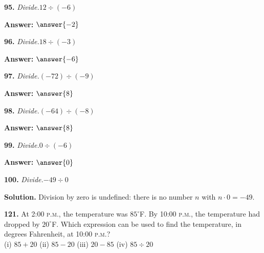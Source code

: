 \documentclass{ximera}
\begin{document}
\begin{problem}
\textbf{95.} \emph{Divide.}\quad $12 \div (-6)$

\textbf{Answer:} $\answer{-2}$
\end{problem}

\begin{problem}
\textbf{96.} \emph{Divide.}\quad $18 \div (-3)$

\textbf{Answer:} $\answer{-6}$
\end{problem}

\begin{problem}
\textbf{97.} \emph{Divide.}\quad $(-72) \div (-9)$

\textbf{Answer:} $\answer{8}$
\end{problem}

\begin{problem}
\textbf{98.} \emph{Divide.}\quad $(-64) \div (-8)$

\textbf{Answer:} $\answer{8}$
\end{problem}

\begin{problem}
\textbf{99.} \emph{Divide.}\quad $0 \div (-6)$

\textbf{Answer:} $\answer{0}$
\end{problem}

\begin{problem}
\textbf{100.} \emph{Divide.}\quad $-49 \div 0$

\begin{multipleChoice}
\end{multipleChoice}

\begin{hint}
\textbf{Solution.} Division by zero is undefined: there is no number $n$ with $n\cdot 0=-49$.
\end{hint}
\end{problem}

\begin{problem}
\textbf{121.} At 2:00 \textsc{p.m.}, the temperature was $85^\circ$F. By 10:00 \textsc{p.m.},
  the temperature had dropped by $20^\circ$F. Which expression can be used to find the
  temperature, in degrees Fahrenheit, at 10:00 \textsc{p.m.}?
  \\[2pt]
  (i) $85 + 20$ \qquad (ii) $85 - 20$ \qquad (iii) $20 - 85$ \qquad (iv) $85 \div 20$

\begin{multipleChoice}
\end{multipleChoice}
\end{problem}
\end{document}
